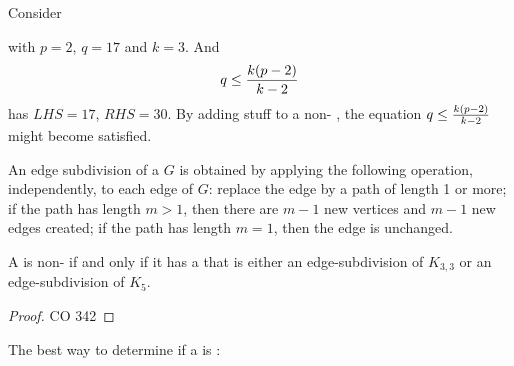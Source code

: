 \documentclass[english, 11pt]{article}
\begin{document}
\begin{exmp}
  Consider
  \begin{center}
\end{center}
with $p = 2$, $q = 17$ and $k = 3$. And
\[ q \leq \frac{k(p-2)}{k-2} \]
has $LHS = 17$, $RHS = 30$. By adding stuff to a non- , the equation $q \leq \frac{k(p-2)}{k-2}$ might become satisfied.
\end{exmp}

\begin{defn}\label{edge subdivision}
An edge subdivision of a  $G$ is obtained by applying the following operation, independently, to each edge of $G$: replace the edge by a path of length 1 or more; if the path has length $m > 1$, then there are $m - 1$ new vertices and $m - 1$ new edges created; if the path has length $m = 1$, then the edge is unchanged.
\end{defn}

\begin{thrm}\label{kuratowski}
A  is non- if and only if it has a  that is either an edge-subdivision of $K_{3,3}$ or an edge-subdivision of $K_5$.
\end{thrm}

\begin{proof}
  CO 342
\end{proof}

The best way to determine if a  is :
\end{document}

